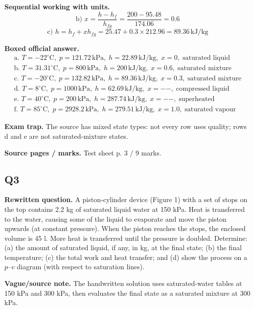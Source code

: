 \textbf{Sequential working with units.}
\[
\text{b) } x=\frac{h-h_f}{h_{fg}}=\frac{200-95.48}{174.06}=0.6
\]
\[
\text{c) } h=h_f+xh_{fg}=25.47+0.3\times 212.96=89.36\,\mathrm{kJ/kg}
\]

\textbf{Boxed official answer.}
\[
\boxed{\begin{array}{l}
\text{a. } T=-22^\circ\mathrm{C},\; p=121.72\,\mathrm{kPa},\; h=22.89\,\mathrm{kJ/kg},\; x=0,\; \text{saturated liquid} \\
\text{b. } T=31.31^\circ\mathrm{C},\; p=800\,\mathrm{kPa},\; h=200\,\mathrm{kJ/kg},\; x=0.6,\; \text{saturated mixture} \\
\text{c. } T=-20^\circ\mathrm{C},\; p=132.82\,\mathrm{kPa},\; h=89.36\,\mathrm{kJ/kg},\; x=0.3,\; \text{saturated mixture} \\
\text{d. } T=8^\circ\mathrm{C},\; p=1000\,\mathrm{kPa},\; h=62.69\,\mathrm{kJ/kg},\; x=--,\; \text{compressed liquid} \\
\text{e. } T=40^\circ\mathrm{C},\; p=200\,\mathrm{kPa},\; h=287.74\,\mathrm{kJ/kg},\; x=--,\; \text{superheated} \\
\text{f. } T=85^\circ\mathrm{C},\; p=2928.2\,\mathrm{kPa},\; h=279.51\,\mathrm{kJ/kg},\; x=1.0,\; \text{saturated vapour}
\end{array}}
\]

\textbf{Exam trap.} The source has mixed state types: not every row uses quality; rows d and e are not saturated-mixture states.

\textbf{Source pages / marks.} Test sheet p. 3 / 9 marks.

\subsection*{Q3}
\textbf{Rewritten question.} A piston-cylinder device (Figure 1) with a set of stops on the top contains 2.2 kg of saturated liquid water at 150 kPa. Heat is transferred to the water, causing some of the liquid to evaporate and move the piston upwards (at constant pressure). When the piston reaches the stops, the enclosed volume is 45 l. More heat is transferred until the pressure is doubled. Determine: (a) the amount of saturated liquid, if any, in kg, at the final state; (b) the final temperature; (c) the total work and heat transfer; and (d) show the process on a $p$--$v$ diagram (with respect to saturation lines).

\textbf{Vague/source note.} The handwritten solution uses saturated-water tables at 150 kPa and 300 kPa, then evaluates the final state as a saturated mixture at 300 kPa.

